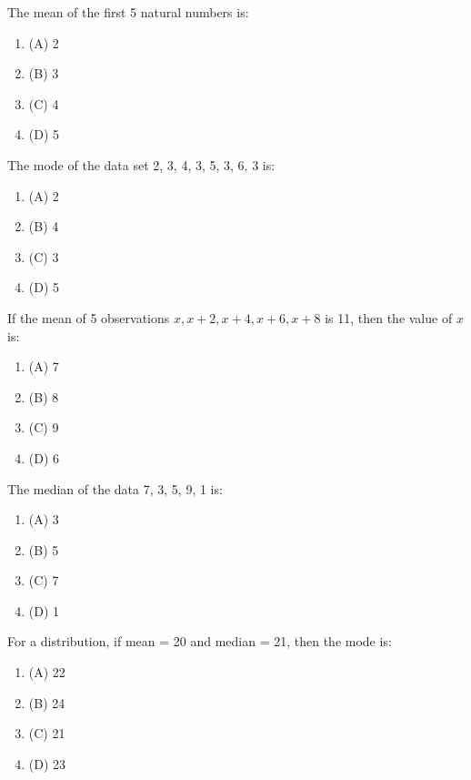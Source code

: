 \documentclass[12pt,a4paper]{exam}
\begin{document}
\begin{questions}
\question[1] The mean of the first 5 natural numbers is:
\begin{enumerate}[label=(\Alph*)]
  \item (A) 2
  \item (B) 3
  \item (C) 4
  \item (D) 5
\end{enumerate}
\vspace{0.15cm}

\question[1] The mode of the data set 2, 3, 4, 3, 5, 3, 6, 3 is:
\begin{enumerate}[label=(\Alph*)]
  \item (A) 2
  \item (B) 4
  \item (C) 3
  \item (D) 5
\end{enumerate}
\vspace{0.15cm}

\question[1] If the mean of 5 observations $x, x+2, x+4, x+6, x+8$ is 11, then the value of $x$ is:
\begin{enumerate}[label=(\Alph*)]
  \item (A) 7
  \item (B) 8
  \item (C) 9
  \item (D) 6
\end{enumerate}
\vspace{0.15cm}

\question[1] The median of the data 7, 3, 5, 9, 1 is:
\begin{enumerate}[label=(\Alph*)]
  \item (A) 3
  \item (B) 5
  \item (C) 7
  \item (D) 1
\end{enumerate}
\vspace{0.15cm}

\question[1] For a distribution, if mean = 20 and median = 21, then the mode is:
\begin{enumerate}[label=(\Alph*)]
  \item (A) 22
  \item (B) 24
  \item (C) 21
  \item (D) 23
\end{enumerate}
\vspace{0.15cm}


\end{questions}
\end{document}

